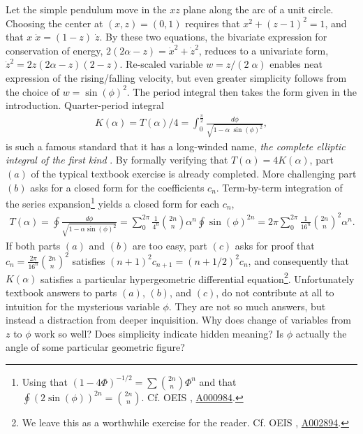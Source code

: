 \documentclass[nofootinbib,preprint]{revtex4-1}
\begin{document}
Let the simple pendulum move in the $xz$ plane along the arc of a unit circle. Choosing 
the center at $(x,z)=(0,1)$ requires that  $x^2+(z-1)^2=1$, and that $x\;\dot{x}=(1-z)\;\dot{z}$.
By these two equations, the bivariate expression for conservation of energy,
$2(2\alpha-z)=\dot{x}^2+\dot{z}^2$, reduces to a univariate form, $\dot{z}^2=2z(2\alpha-z)(2-z)$. 
Re-scaled variable 
$w=z/(2\;\alpha)$ enables neat expression of the rising/falling velocity, but even greater 
simplicity follows from the choice of $w=\sin(\phi)^2$. The period integral then takes 
the form given in the introduction. Quarter-period integral
\begin{eqnarray}
K(\alpha)=T(\alpha)/4=\int_{0}^{\frac{\pi}{2}} \frac{d\phi}{\sqrt{1-\alpha\;\sin(\phi)^2}}, 
\nonumber
\end{eqnarray}
is such a famous standard that it has a long-winded name, \textit{the complete elliptic 
integral of the first kind} \cite{LL1982}. By formally verifying that $T(\alpha)=4K(\alpha)$, 
part $(a)$ of the typical textbook exercise is already completed. More challenging part 
$(b)$ asks for a closed form for the coefficients $c_n$. Term-by-term integration of 
the series expansion\footnote{Using that $(1-4\Phi)^{-1/2} = \sum \binom{2n}{n}\Phi^n $ 
and that $\oint (2\sin(\phi))^{2n} = \binom{2n}{n}$. Cf. OEIS \cite{SLOANE2019},  
\href{https://oeis.org/A000984}{A000984}.} 
yields a closed form for each $c_n$,
\begin{eqnarray}
T(\alpha)= \oint \frac{d\phi}{\sqrt{1-\alpha \sin(\phi)^2}}
=\sum_{0}^{2\pi} \frac{1}{4^n}\binom{2n}{n} \alpha^n \oint\sin(\phi)^{2n}
= 2\pi \sum_{0}^{2\pi} \frac{1}{16^n}\binom{2n}{n}^2 \alpha^n. \nonumber 
\end{eqnarray}
If both parts $(a)$ and $(b)$ are too easy, part $(c)$ asks for proof that 
$c_n=\frac{2\pi}{16^n}\binom{2n}{n}^2$ satisfies ${(n+1)^2 c_{n+1}=(n+1/2)^2c_n}$, and 
consequently that $K(\alpha)$ satisfies a particular hypergeometric differential 
equation\footnote{We leave this as a worthwhile exercise for the reader. Cf. 
OEIS \cite{SLOANE2019}, \href{https://oeis.org/A002894}{A002894}.}. Unfortunately textbook 
answers to parts $(a)$, $(b)$, and $(c)$, do not contribute at all to intuition for 
the mysterious variable $\phi$. They are not so much answers, but instead a distraction
from deeper inquisition. Why does change of variables from $z$ to $\phi$ 
work so well? Does simplicity indicate hidden meaning? Is $\phi$ actually
the angle of some particular geometric figure? 
\end{document}
